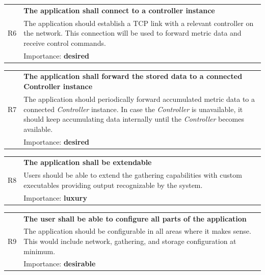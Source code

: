 \documentclass[12pt,a4paper,table]{article}
\begin{document}
                \vspace{0.5cm}
                \noindent
                \begin{tabular}{ p{0.7cm}|p{14.5cm} }
                    \multirow{3}{*}{R6 } & \textbf{The application shall connect to a controller instance}\\
                    \cline{2-2}
                    & The application should establish a TCP link with a relevant controller on the network. This connection will be used to forward metric data and receive control commands.\\
                    \cline{2-2}
                    & Importance: \textbf{desired}
                \end{tabular}

                \vspace{0.5cm}
                \noindent
                \begin{tabular}{ p{0.7cm}|p{14.5cm} }
                    \multirow{3}{*}{R7 } & \textbf{The application shall forward the stored data to a connected Controller instance}\\
                    \cline{2-2}
                    & The application should periodically forward accumulated metric data to a connected \textit{Controller} instance. In case the \textit{Controller} is unavailable, it should keep accumulating data internally until the \textit{Controller} becomes available.\\
                    \cline{2-2}
                    & Importance: \textbf{desired}
                \end{tabular}

                \vspace{0.5cm}
                \noindent
                \begin{tabular}{ p{0.7cm}|p{14.5cm} }
                    \multirow{3}{*}{R8 } & \textbf{The application shall be extendable}\\
                    \cline{2-2}
                    & Users should be able to extend the gathering capabilities with custom executables providing output recognizable by the system.\\
                    \cline{2-2}
                    & Importance: \textbf{luxury}
                \end{tabular}

                \vspace{0.5cm}
                \noindent
                \begin{tabular}{ p{0.7cm}|p{14.5cm} }
                    \multirow{3}{*}{R9 } & \textbf{The user shall be able to configure all parts of the application}\\
                    \cline{2-2}
                    & The application should be configurable in all areas where it makes sense. This would include network, gathering, and storage configuration at minimum.\\
                    \cline{2-2}
                    & Importance: \textbf{desirable}
                \end{tabular}
\end{document}
